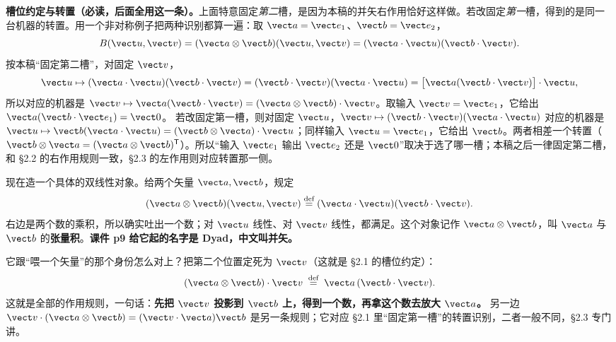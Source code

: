\documentclass[11pt]{ctexart}
\let\origsubhdr\subhdr
\renewcommand{\subhdr}[1]{\par\needspace{3\baselineskip}\origsubhdr{#1}}
\begin{document}
\textbf{槽位约定与转置（必读，后面全用这一条）。}上面特意固定\emph{第二}槽，是因为本稿的并矢右作用恰好这样做。若改固定\emph{第一}槽，得到的是同一台机器的转置。用一个非对称例子把两种识别都算一遍：取 $\vect a=\vect e_1$、$\vect b=\vect e_2$，
\[
B(\vect u,\vect v)=(\vect a\otimes\vect b)(\vect u,\vect v)=(\vect a\cdot\vect u)(\vect b\cdot\vect v).
\]
按本稿“固定第二槽”，对固定 $\vect v$，
\[
\vect u\mapsto(\vect a\cdot\vect u)(\vect b\cdot\vect v)=(\vect b\cdot\vect v)(\vect a\cdot\vect u)
=\bigl[\vect a(\vect b\cdot\vect v)\bigr]\cdot\vect u ,
\]
所以对应的机器是 $\vect v\mapsto\vect a(\vect b\cdot\vect v)=(\vect a\otimes\vect b)\cdot\vect v$。取输入 $\vect v=\vect e_1$，它给出 $\vect a(\vect b\cdot\vect e_1)=\vect0$。
若改固定第一槽，则对固定 $\vect u$，$\vect v\mapsto(\vect b\cdot\vect v)(\vect a\cdot\vect u)$ 对应的机器是 $\vect u\mapsto\vect b(\vect a\cdot\vect u)=(\vect b\otimes\vect a)\cdot\vect u$；同样输入 $\vect u=\vect e_1$，它给出 $\vect b$。两者相差一个转置（$\vect b\otimes\vect a=(\vect a\otimes\vect b)^{\mathsf T}$）。所以“输入 $\vect e_1$ 输出 $\vect e_2$ 还是 $\vect0$”取决于选了哪一槽；本稿之后一律固定第二槽，和 §2.2 的右作用规则一致，§2.3 的左作用则对应转置那一侧。


现在造一个具体的双线性对象。给两个矢量 $\vect a,\vect b$，规定
\[
(\vect a\otimes\vect b)(\vect u,\vect v)\stackrel{\text{def}}{=}(\vect a\cdot\vect u)(\vect b\cdot\vect v).
\]
右边是两个数的乘积，所以确实吐出一个数；对 $\vect u$ 线性、对 $\vect v$ 线性，都满足。这个对象记作 $\vect a\otimes\vect b$，叫 $\vect a$ 与 $\vect b$ 的\textbf{张量积}。\textbf{课件 p9 给它起的名字是 Dyad，中文叫并矢。}

它跟“喂一个矢量”的那个身份怎么对上？把第二个位置定死为 $\vect v$（这就是 §2.1 的槽位约定）：
\[
(\vect a\otimes\vect b)\cdot\vect v\;\stackrel{\text{def}}{=}\;\vect a\,(\vect b\cdot\vect v).
\]
这就是全部的作用规则，一句话：\textbf{先把 $\vect v$ 投影到 $\vect b$ 上，得到一个数，再拿这个数去放大 $\vect a$。}
另一边 $\vect v\cdot(\vect a\otimes\vect b)=(\vect v\cdot\vect a)\vect b$ 是另一条规则；它对应 §2.1 里“固定第一槽”的转置识别，二者一般不同，§2.3 专门讲。
\end{document}
